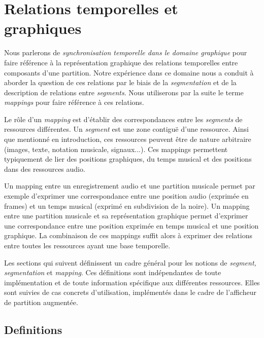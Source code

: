 \documentclass{article}
\begin{document}
\section{Relations temporelles et graphiques}

Nous parlerons de \emph{synchronisation temporelle dans le domaine graphique} pour faire référence à la représentation graphique des relations temporelles entre composants d'une partition. 
Notre expérience dans ce domaine \cite{chapuis07,Fober:07a} nous a conduit à aborder la question de ces relations par le biais de la \emph{segmentation} et de la description de relations entre \emph{segments}. Nous utiliserons par la suite le terme \emph{mappings} pour faire référence à ces relations.

Le rôle d'un \emph{mapping} est d'établir des correspondances entre les \emph{segments} de ressources différentes. Un \emph{segment} est une zone contiguë d'une ressource.
Ainsi que mentionné en introduction, ces ressources peuvent être de nature arbitraire (images, texte, notation musicale, signaux...). Ces mappings permettent typiquement de lier des positions graphiques, du temps musical et des positions dans des ressources audio.

Un mapping entre un enregistrement audio et une partition musicale permet par exemple d'exprimer une correspondance entre une position audio (exprimée en frames) et un temps musical 
(exprimé en subdivision de la noire). Un mapping entre une partition musicale et sa représentation graphique permet d'exprimer une correspondance entre une position exprimée en temps musical 
et une position graphique. La combinaison de ces mappings suffit alors à exprimer des relations entre toutes les ressources ayant une base temporelle.

Les sections qui suivent définissent un cadre général pour les notions de \emph{segment, segmentation} et \emph{mapping}. Ces définitions sont indépendantes de toute implémentation et de toute information spécifique aux différentes ressources. Elles sont suivies de cas concrets d'utilisation, implémentés dans le cadre de l'afficheur de partition augmentée.


\subsection{Definitions}
\end{document}
